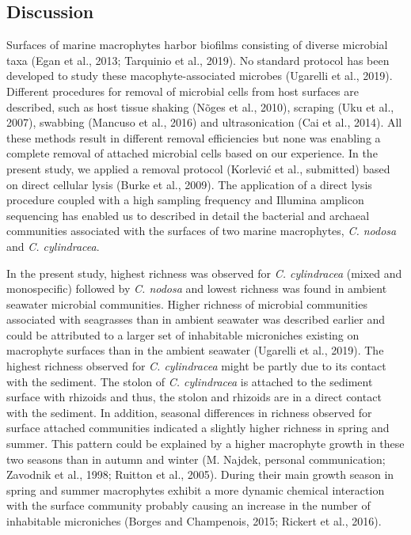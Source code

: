 \documentclass[12pt,]{article}
\begin{document}
\newpage

\hypertarget{discussion}{%
\subsection{Discussion}\label{discussion}}

Surfaces of marine macrophytes harbor biofilms consisting of diverse
microbial taxa (Egan et al., 2013; Tarquinio et al., 2019). No standard
protocol has been developed to study these macophyte-associated microbes
(Ugarelli et al., 2019). Different procedures for removal of microbial
cells from host surfaces are described, such as host tissue shaking
(Nõges et al., 2010), scraping (Uku et al., 2007), swabbing (Mancuso et
al., 2016) and ultrasonication (Cai et al., 2014). All these methods
result in different removal efficiencies but none was enabling a
complete removal of attached microbial cells based on our experience. In
the present study, we applied a removal protocol (Korlević et al.,
submitted) based on direct cellular lysis (Burke et al., 2009). The
application of a direct lysis procedure coupled with a high sampling
frequency and Illumina amplicon sequencing has enabled us to described
in detail the bacterial and archaeal communities associated with the
surfaces of two marine macrophytes, \emph{C. nodosa} and \emph{C.
cylindracea}.

In the present study, highest richness was observed for \emph{C.
cylindracea} (mixed and monospecific) followed by \emph{C. nodosa} and
lowest richness was found in ambient seawater microbial communities.
Higher richness of microbial communities associated with seagrasses than
in ambient seawater was described earlier and could be attributed to a
larger set of inhabitable microniches existing on macrophyte surfaces
than in the ambient seawater (Ugarelli et al., 2019). The highest
richness observed for \emph{C. cylindracea} might be partly due to its
contact with the sediment. The stolon of \emph{C. cylindracea} is
attached to the sediment surface with rhizoids and thus, the stolon and
rhizoids are in a direct contact with the sediment. In addition,
seasonal differences in richness observed for surface attached
communities indicated a slightly higher richness in spring and summer.
This pattern could be explained by a higher macrophyte growth in these
two seasons than in autumn and winter (M. Najdek, personal
communication; Zavodnik et al., 1998; Ruitton et al., 2005). During
their main growth season in spring and summer macrophytes exhibit a more
dynamic chemical interaction with the surface community probably causing
an increase in the number of inhabitable microniches (Borges and
Champenois, 2015; Rickert et al., 2016).
\end{document}
